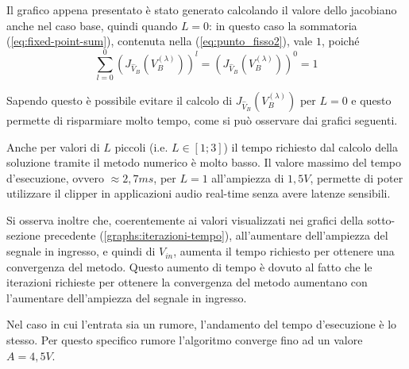 			Il grafico appena presentato è stato generato calcolando il valore dello jacobiano anche nel caso base, quindi quando $L = 0$: in questo caso la sommatoria (\ref{eq:fixed-point-sum}), contenuta nella (\ref{eq:punto_fisso2}), vale $1$, poiché
			\[
				\sum_{l=0}^{0} \left(J_{\widehat V_{B}}(V_{B}^{(\lambda)})\right)^{l} = \left(J_{\widehat V_{B}}(V_{B}^{(\lambda)})\right)^{0} = 1
			\]
			
			Sapendo questo è possibile evitare il calcolo di $J_{\widehat V_{B}}(V_{B}^{(\lambda)})$ per $L = 0$ e questo permette di risparmiare molto tempo, come si può osservare dai grafici seguenti.
			
			\graficospace
			\graficospace
			\graficospace
			\graficospace
			\graficospace
			
			Anche per valori di $L$ piccoli (i.e. $L \in [1;3]$) il tempo richiesto dal calcolo della soluzione tramite il metodo numerico è molto basso. Il valore massimo del tempo d'esecuzione, ovvero $\approx 2,7ms$, per $L = 1$ all'ampiezza di $1,5V$, permette di poter utilizzare il clipper in applicazioni audio real-time senza avere latenze sensibili.
			
			Si osserva inoltre che, coerentemente ai valori visualizzati nei grafici della sotto-sezione precedente (\ref{graphs:iterazioni-tempo}), all'aumentare dell'ampiezza del segnale in ingresso, e quindi di $V_{in}$, aumenta il tempo richiesto per ottenere una convergenza del metodo. Questo aumento di tempo è dovuto al fatto che le iterazioni richieste per ottenere la convergenza del metodo aumentano con l'aumentare dell'ampiezza del segnale in ingresso.
			\pagebreak
			
			Nel caso in cui l'entrata sia un rumore, l'andamento del tempo d'esecuzione è lo stesso. Per questo specifico rumore l'algoritmo converge fino ad un valore $A = 4,5V$.
			
			\graficospace
			\graficospace
			\graficospace
			\graficospace